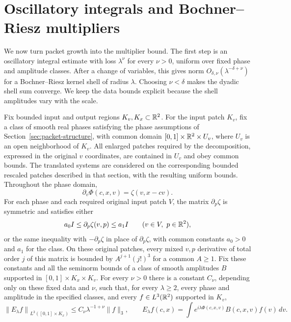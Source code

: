 \section{Oscillatory integrals and Bochner--Riesz multipliers}
\label{sec:multiplier}

We now turn packet growth into the multiplier bound. The first step is
an oscillatory integral estimate with loss $\lambda^\nu$ for every
$\nu>0$, uniform over fixed phase and amplitude classes. After a
change of variables, this gives norm
$O_{\delta,\nu}(\lambda^{-\delta+\nu})$ for a Bochner--Riesz kernel
shell of radius $\lambda$. Choosing $\nu<\delta$ makes the dyadic
shell sum converge. We keep the data bounds explicit because the
shell amplitudes vary with the scale.

\begin{theorem}\label{thm:oscillatory-estimate}
Fix bounded input and output regions $K_v,K_x\subset\mathbb R^2$.
For the input patch $K_v$, fix a class of smooth real phases satisfying
the phase assumptions of Section~\ref{sec:packet-structure}, with
common domain $[0,1]\times\mathbb R^2\times U_v$, where $U_v$ is an open
neighborhood of $K_v$.  All enlarged patches required by the
decomposition, expressed in the original $v$ coordinates, are contained
in $U_v$ and obey common bounds.  The translated systems are considered
on the corresponding bounded rescaled patches described in that section,
with the resulting uniform bounds.  Throughout the phase domain,
\[
 \partial_v\Phi(c,x,v)=\zeta(v,x-cv).
\]
For each phase and each required original input patch $V$, the matrix
$\partial_p\zeta$ is symmetric and satisfies either
\[
 a_0I\le\partial_p\zeta(v,p)\le a_1I
 \qquad(v\in V,\ p\in\mathbb R^2),
\]
or the same inequality with $-\partial_p\zeta$ in place of
$\partial_p\zeta$, with common constants $a_0>0$ and $a_1$ for the
class.  On these original patches, every mixed $v,p$ derivative of total
order $j$ of this matrix is bounded by $A^{j+1}(j!)^3$ for a common
$A\ge1$.  Fix these constants and all the seminorm bounds of a class of
smooth amplitudes $B$ supported in
$[0,1]\times K_x\times K_v$.  For every $\nu>0$ there is a constant
$C_\nu$, depending only on these fixed data and $\nu$, such that, for
every $\lambda\ge2$, every phase and amplitude in the specified classes,
and every $f\in L^3(\mathbb R^2)$ supported in $K_v$,
\begin{equation}\label{eq:oscillatory-estimate}
 \left\|E_\lambda f\right\|_{L^3([0,1]\times K_x)}
 \le C_\nu\lambda^{-1+\nu}\|f\|_3,
 \qquad
 E_\lambda f(c,x)=\int e^{i\lambda\Phi(c,x,v)}B(c,x,v)f(v)\,dv.
\end{equation}
\end{theorem}


